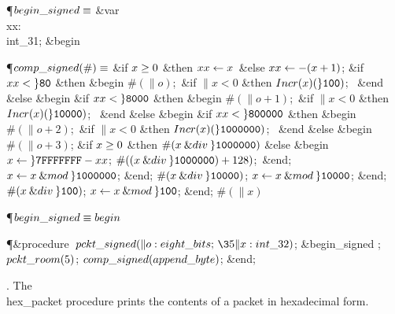 \Y\P\D {}$\\{begin\_signed}\S$\1\6
\4\&{var} \\{xx}: \\{int\_31};\2\6
\&{begin} \par
\P\D {}$\\{comp\_signed}(\#)\S$\1\6
\&{if} $\|x\G0$ \1\&{then}\5
$\\{xx}\K\|x$\ \&{else} $\\{xx}\K-(\|x+1)$;\2\2\6
\&{if} $\\{xx}<\H{80}$ \1\&{then}\6
\&{begin} $\#(\|o)$;\ \&{if} $\|x<0$ \1\&{then}\5
$\\{Incr}(\|x)(\H{100})$;\ \2\6
\&{end}\6
\4\&{else} \&{begin} \&{if} $\\{xx}<\H{8000}$ \1\&{then}\6
\&{begin} $\#(\|o+1)$;\ \&{if} $\|x<0$ \1\&{then}\5
$\\{Incr}(\|x)(\H{10000})$;\ \2\6
\&{end}\6
\4\&{else} \&{begin} \&{if} $\\{xx}<\H{800000}$ \1\&{then}\6
\&{begin} $\#(\|o+2)$;\ \&{if} $\|x<0$ \1\&{then}\5
$\\{Incr}(\|x)(\H{1000000})$;\ \2\6
\&{end}\6
\4\&{else} \&{begin} $\#(\|o+3)$;\6
\&{if} $\|x\G0$ \1\&{then}\5
$\#(\|x\mathbin{\&{div}}\H{1000000})$\6
\4\&{else} \&{begin} $\|x\K\H{7FFFFFFF}-\\{xx}$;\5
$\#((\|x\mathbin{\&{div}}\H{1000000})+128)$;\ \&{end};\2\6
$\|x\K\|x\mathbin{\&{mod}}\H{1000000}$;\6
\&{end};\2\6
$\#(\|x\mathbin{\&{div}}\H{10000})$;\5
$\|x\K\|x\mathbin{\&{mod}}\H{10000}$;\6
\&{end};\2\6
$\#(\|x\mathbin{\&{div}}\H{100})$;\5
$\|x\K\|x\mathbin{\&{mod}}\H{100}$;\6
\&{end};\2\6
$\#(\|x)$\par
\P\F {}$\\{begin\_signed}\S\\{begin}$\par
\Y\P\4\&{procedure}\1\  $\\{pckt\_signed}(\|o:\\{eight\_bits};\,\35\|x:%
\\{int\_32})$;\2\6
\&{begin\_signed} ;\5
$\\{pckt\_room}(5)$;\5
$\\{comp\_signed}(\\{append\_byte})$;\6
\&{end};\par
\fi

. The \\{hex\_packet} procedure prints the contents of a packet in
hexadecimal form.

